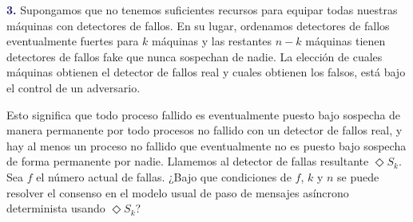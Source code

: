 \newline
\textbf{\textcolor{MidnightBlue}{3.}}
Supongamos que no tenemos suficientes recursos para equipar todas nuestras máquinas
con detectores de fallos. En su lugar, ordenamos detectores de fallos eventualmente
fuertes para $k$ máquinas y las restantes $n-k$ máquinas tienen detectores de fallos
fake que nunca sospechan de nadie. La elección de cuales máquinas obtienen el
detector 
de fallos real y cuales obtienen los falsos, está bajo el control de un adversario.

Esto significa que todo proceso fallido es eventualmente puesto bajo sospecha de
manera permanente por todo procesos no fallido con un detector de fallos real, y hay
al menos un proceso no fallido que eventualmente no es puesto bajo sospecha de forma
permanente por nadie. Llamemos al detector de fallas resultante $\Diamond S_k$.\\

Sea $f$ el número actual de fallas. ¿Bajo que condiciones de $f$, $k$ y $n$ se puede
resolver el consenso en el modelo usual de paso de mensajes asíncrono determinista
usando $\Diamond S_k$?\\
